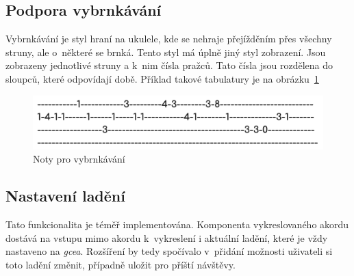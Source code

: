 \subsection{Podpora vybrnkávání}
Vybrnkávání je styl hraní na ukulele, kde se nehraje přejížděním přes všechny struny, ale o~některé se brnká. Tento styl má úplně jiný styl zobrazení. Jsou zobrazeny jednotlivé struny a k~nim čísla pražců. Tato čísla jsou rozdělena do sloupců, které odpovídají době. Příklad takové tabulatury je na obrázku~\ref{fig:tablature}

\begin{figure}[h!]
    \centering
    \includegraphics[width=\textwidth]{assets/picking.png}
    \caption{Noty pro vybrnkávání}
    \label{fig:tablature}
\end{figure}

\subsection{Nastavení ladění}
Tato funkcionalita je téměř implementována. Komponenta vykreslovaného akordu dostává na vstupu mimo akordu k~vykreslení i aktuální ladění, které je vždy nastaveno na \emph{gcea}. Rozšíření by tedy spočívalo v~přidání možnosti uživateli si toto ladění změnit, případně uložit pro příští návštěvy.


